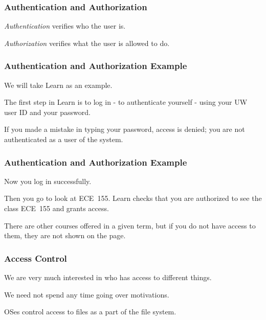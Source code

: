 \begin{frame}
\frametitle{Authentication and Authorization}
\begin{changemargin}{1cm}

\textit{Authentication} verifies who the user is. 

\textit{Authorization} verifies what the user is allowed to do. 

\end{changemargin}
\end{frame}


\begin{frame}
\frametitle{Authentication and Authorization Example}
\begin{changemargin}{1cm}

We will take Learn as an example. 

The first step in Learn is to log in - to authenticate yourself - using your UW user ID and your password. 

If you made a mistake in typing your password, access is denied; you are not authenticated as a user of the system. 

\end{changemargin}
\end{frame}

\begin{frame}
\frametitle{Authentication and Authorization Example}
\begin{changemargin}{1cm}

Now you log in successfully.

Then you go to look at ECE~155. Learn checks that you are authorized to see the class ECE~155 and grants access. 

There are other courses offered in a given term, but if you do not have access to them, they are not shown on the page.

\end{changemargin}
\end{frame}

\begin{frame}
\frametitle{Access Control}
\begin{changemargin}{1cm}

We are very much interested in who has access to different things.

We need not spend any time going over motivations.

OSes control access to files as a part of the file system.

\end{changemargin}
\end{frame}

